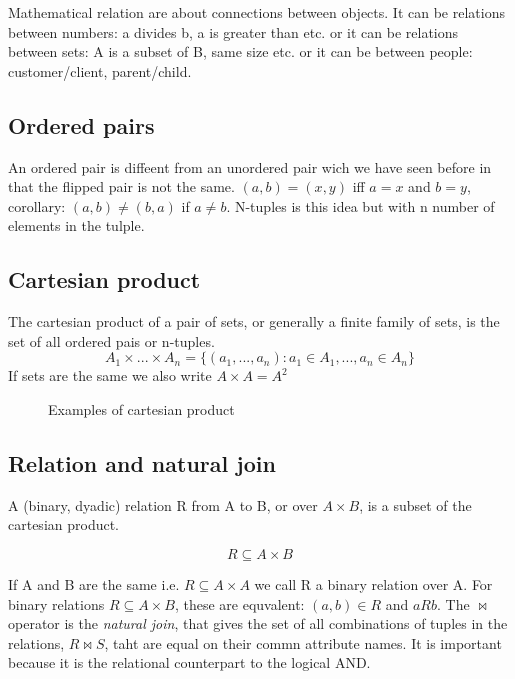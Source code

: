 \documentclass[12pt]{article} %
\begin{document}
Mathematical relation are about connections between objects. It can be relations between numbers: a divides b, a is greater than etc. or it can be relations between sets: A is a subset of B, same size etc. or it can be between people: customer/client, parent/child.

\subsection{Ordered pairs}
An ordered pair is diffeent from an unordered pair wich we have seen before in that the flipped pair is not the same. $(a,b) = (x,y)$ iff $a = x$ and $b = y$, corollary: $(a,b) \neq (b,a)$ if $a \neq b$. N-tuples is this idea but with n number of elements in the tulple.

\subsection{Cartesian product}
The cartesian product of a pair of sets, or generally a finite family of sets, is the set of all ordered pais or n-tuples.
\[
    A_1 \times ... \times A_n = \{(a_1 , ...,a_n) : a_1 \in A_1, ..., a_n \in A_n\}
\]
If sets are the same we also write $A \times A = A^2$

\begin{figure}[H]
\caption{Examples of cartesian product}
\label{Cartesian product examples}
\end{figure}

\subsection{Relation and natural join}

A (binary, dyadic) relation R from A to B, or over $A \times B$, is a subset of the cartesian product.

\[
    R \subseteq A \times B
\]

If A and B are the same i.e. $R \subseteq A \times A$ we call R a binary relation over A. For binary relations $R \subseteq A \times B$, these are equvalent: $(a,b) \in R$ and $aRb$. The $\bowtie$ operator is the \textit{natural join}, that gives the set of all combinations of tuples in the relations, $R \bowtie S$, taht are equal on their commn attribute names. It is important because it is the relational counterpart to the logical AND.
\end{document}
